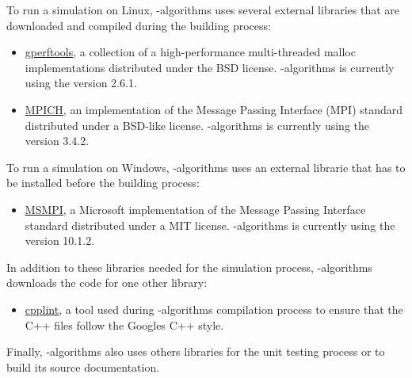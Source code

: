 \documentclass[a4paper, 12pt]{report}
\begin{document}
To run a simulation on Linux, \Dynawo-algorithms uses several external libraries that are downloaded and compiled during the building process:
\begin{itemize}
\item \href{https://github.com/gperftools/gperftools} {\underline{gperftools}}, a collection of a high-performance multi-threaded
malloc implementations distributed under the BSD license. \Dynawo-algorithms is currently using the version 2.6.1.

\item \href{https://www.mpich.org/}{\underline{MPICH}}, an implementation of the Message Passing Interface (MPI) standard distributed under a BSD-like license. 
\Dynawo-algorithms is currently using the version 3.4.2.
\end{itemize}

To run a simulation on Windows, \Dynawo-algorithms uses an external librarie that has to be installed before the building process:
\begin{itemize}
\item \href{https://learn.microsoft.com/en-us/message-passing-interface/microsoft-mpi?redirectedfrom=MSDN}{\underline{MSMPI}}, a Microsoft implementation of the Message Passing Interface standard distributed under a MIT license.
\Dynawo-algorithms is currently using the version 10.1.2.
\end{itemize}

In addition to these libraries needed for the simulation process, \Dynawo-algorithms downloads the code for one other library:
\begin{itemize}
\item \href{https://github.com/google/styleguide/tree/gh-pages/cpplint}{\underline{cpplint}}, 
a tool used during \Dynawo-algorithms compilation process to ensure that the C++ files follow the Google\textquotesingle s C++ style.
\end{itemize}

Finally, \Dynawo-algorithms also uses others libraries for the unit testing process or to build its source documentation. 
\end{document}
